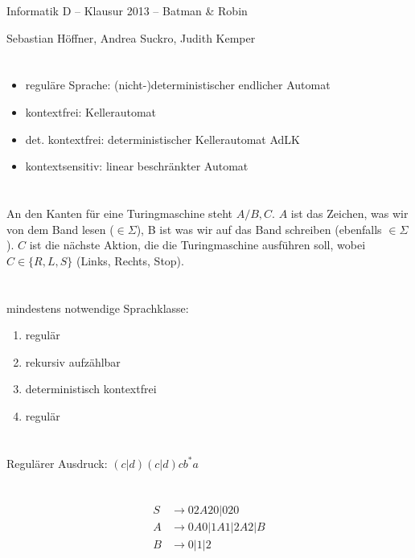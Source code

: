 \documentclass{article}
\begin{document}
\begin{center}
  \Large{Informatik D -- Klausur 2013 -- Batman \& Robin}

  \large{Sebastian Höffner, Andrea Suckro, Judith Kemper}
\end{center}

\section{}
\begin{itemize}
	\item reguläre Sprache: (nicht-)deterministischer endlicher Automat
  \item kontextfrei: Kellerautomat
  \item det. kontextfrei: deterministischer Kellerautomat AdLK
  \item kontextsensitiv: linear beschränkter Automat
\end{itemize}

\section{}
An den Kanten für eine Turingmaschine steht $A/B,C$. $A$ ist das Zeichen, was wir von dem Band lesen ($\in \Sigma$), B ist was wir auf das Band schreiben (ebenfalls $\in \Sigma$). $C$ ist die nächste Aktion, die die Turingmaschine ausführen soll, wobei $C \in \{R, L, S\}$ (Links, Rechts, Stop). 

\section{}
mindestens notwendige Sprachklasse:
\begin{enumerate}
	\item regulär
  \item rekursiv aufzählbar
  \item deterministisch kontextfrei
  \item regulär
\end{enumerate}

\section{}
Regulärer Ausdruck: $(c|d)(c|d)cb^*a$

\section{}
\begin{align*}
S&\rightarrow 02A20 | 020\\
A&\rightarrow 0A0 | 1A1 | 2A2 | B\\
B&\rightarrow 0|1|2
\end{align*}
\end{document}
